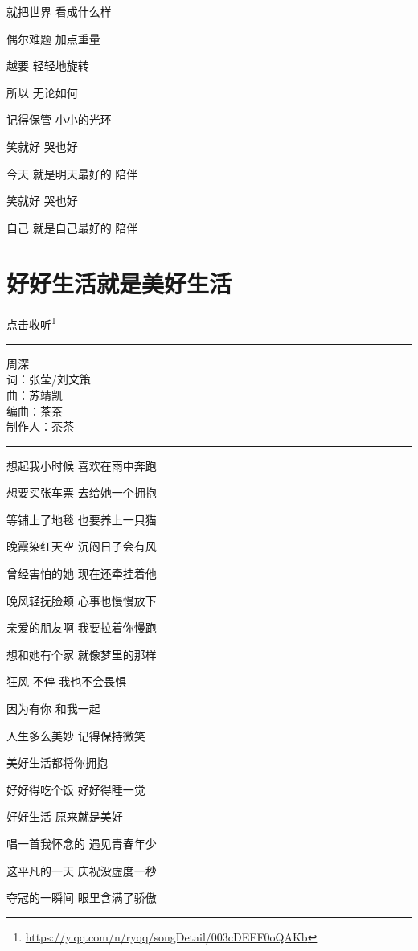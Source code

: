 \documentclass[]{ctexbook}
\renewcommand{\href}[2]{#2\footnote{\url{#1}}}
\begin{document}
就把世界 看成什么样

偶尔难题 加点重量

越要 轻轻地旋转

所以 无论如何

记得保管 小小的光环

笑就好 哭也好

今天 就是明天最好的 陪伴

笑就好 哭也好

自己 就是自己最好的 陪伴

\section*{好好生活就是美好生活}\label{live-happy-life-happy}


\href{https://y.qq.com/n/ryqq/songDetail/003cDEFF0oQAKb}{点击收听}

\begin{center}\rule{0.5\linewidth}{0.5pt}\end{center}

周深\\
词：张莹/刘文策\\
曲：苏靖凯\\
编曲：茶茶\\
制作人：茶茶

\begin{center}\rule{0.5\linewidth}{0.5pt}\end{center}

想起我小时候 喜欢在雨中奔跑

想要买张车票 去给她一个拥抱

等铺上了地毯 也要养上一只猫

晚霞染红天空 沉闷日子会有风

曾经害怕的她 现在还牵挂着他

晚风轻抚脸颊 心事也慢慢放下

亲爱的朋友啊 我要拉着你慢跑

想和她有个家 就像梦里的那样

狂风 不停 我也不会畏惧

因为有你 和我一起

人生多么美妙 记得保持微笑

美好生活都将你拥抱

好好得吃个饭 好好得睡一觉

好好生活 原来就是美好

唱一首我怀念的 遇见青春年少

这平凡的一天 庆祝没虚度一秒

夺冠的一瞬间 眼里含满了骄傲
\end{document}
